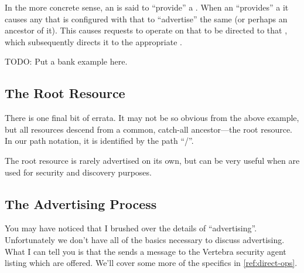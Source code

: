 
In the more concrete sense, an \actor{} is said to ``provide'' a \resource{}.  When an \actor{} ``provides'' a \resource{} it causes any \agent{} that is configured with that \actor{} to ``advertise'' the same \resource{} (or perhaps an ancestor of it).  This causes requests to operate on that \resource{} to be directed to that \agent{}, which subsequently directs it to the appropriate \actor{}.

TODO: Put a bank example here.

\subsection{The Root Resource}

There is one final bit of errata.  It may not be so obvious from the above example, but all resources descend from a common, catch-all ancestor---the {\sf root} resource.  In our path notation, it is identified by the path ``{\sf /}''.

The root resource is rarely advertised on its own, but can be very useful when \resources{} are used for security and discovery purposes.

\subsection{The Advertising Process}

You may have noticed that I brushed over the details of ``advertising''.  Unfortunately we don't have all of the basics necessary to discuss advertising.  What I can tell you is that the \agent{} sends a message to the Vertebra security agent listing which \resources{} are offered.  We'll cover some more of the specifics in \ref{ref:direct-ops}.


